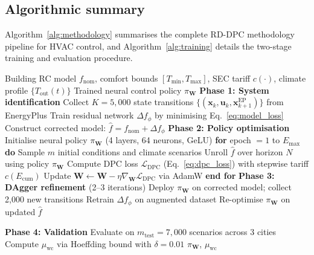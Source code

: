 \documentclass[12pt]{article}
\theoremstyle{plain}
\theoremstyle{definition}
\begin{document}
\subsection{Algorithmic summary}

Algorithm~\ref{alg:methodology} summarises the complete RD-DPC methodology pipeline for HVAC control, and Algorithm~\ref{alg:training} details the two-stage training and evaluation procedure.

\begin{algorithm}[H]
\caption{RD-DPC Methodology for Multi-Zone HVAC Control}\label{alg:methodology}
\begin{algorithmic}[1]
\REQUIRE Building RC model $f_{\text{nom}}$, comfort bounds $[T_{\min}, T_{\max}]$, SEC tariff $c(\cdot)$, climate profile $\{T_{\text{out}}(t)\}$
\ENSURE Trained neural control policy $\pi_{\mathbf{W}}$
\STATE \textbf{Phase 1: System identification}
\STATE \quad Collect $K = 5{,}000$ state transitions $\{(\mathbf{x}_k, \mathbf{u}_k, \mathbf{x}_{k+1}^{\text{EP}})\}$ from EnergyPlus
\STATE \quad Train residual network $\Delta f_\phi$ by minimising Eq.~\ref{eq:model_loss}
\STATE \quad Construct corrected model: $\hat{f} = f_{\text{nom}} + \Delta f_\phi$
\STATE \textbf{Phase 2: Policy optimisation}
\STATE \quad Initialise neural policy $\pi_{\mathbf{W}}$ (4 layers, 64 neurons, GeLU)
\STATE \quad \textbf{for} epoch $= 1$ to $E_{\max}$ \textbf{do}
\STATE \quad \quad Sample $m$ initial conditions and climate scenarios
\STATE \quad \quad Unroll $\hat{f}$ over horizon $N$ using policy $\pi_{\mathbf{W}}$
\STATE \quad \quad Compute DPC loss $\mathcal{L}_{\text{DPC}}$ (Eq.~\ref{eq:dpc_loss}) with stepwise tariff $c(E_{\text{cum}})$
\STATE \quad \quad Update $\mathbf{W} \leftarrow \mathbf{W} - \eta \nabla_{\mathbf{W}} \mathcal{L}_{\text{DPC}}$ via AdamW
\STATE \quad \textbf{end for}
\STATE \textbf{Phase 3: DAgger refinement} (2--3 iterations)
\STATE \quad Deploy $\pi_{\mathbf{W}}$ on corrected model; collect 2{,}000 new transitions
\STATE \quad Retrain $\Delta f_\phi$ on augmented dataset
\STATE \quad Re-optimise $\pi_{\mathbf{W}}$ on updated $\hat{f}$

\STATE \textbf{Phase 4: Validation}
\STATE \quad Evaluate on $m_{\text{test}} = 7{,}000$ scenarios across 3 cities
\STATE \quad Compute $\mu_{\text{wc}}$ via Hoeffding bound with $\delta = 0.01$
\RETURN $\pi_{\mathbf{W}}$, $\mu_{\text{wc}}$
\end{algorithmic}
\end{algorithm}
\end{document}
